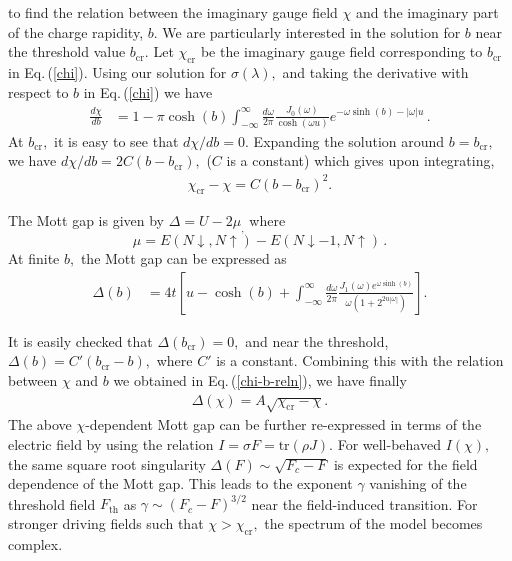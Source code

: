 \documentclass[aps,twocolumn,prl,10pt,amsmath,amssymb,nofootinbib,showpacs,superscriptaddress,floatfix]{revtex4-1}
\begin{document}
to find the relation between the imaginary gauge field $\chi$ and
the imaginary part of the charge rapidity, $b$. We are particularly
interested in the solution for $b$ near the threshold value $b_{\text{cr}}.$
Let $\chi_{\text{cr}}$ be the imaginary gauge field corresponding
to $b_{\text{cr}}$ in Eq.\,(\ref{chi}). Using our solution for $\sigma(\lambda),$
and taking the derivative with respect to $b$ in Eq.\,(\ref{chi}) we have 
\begin{align}
	\frac{d\chi}{db} & =1-\pi\cosh(b)\int_{-\infty}^{\infty}\frac{d\omega}{2\pi}\frac{J_{0}(\omega)}{\cosh(\omega u)}e^{-\omega\sinh(b)-|\omega|u}\,.\label{chi-soln}
\end{align}
At $b_{\text{cr}},$ it is easy to see that $d\chi/db=0.$ Expanding
the solution around $b=b_{\text{cr}},$ we have $d\chi/db=2C(b-b_{\text{cr}}),$
($C$ is a constant) which gives upon integrating, 
\begin{align}
	\chi_{\text{cr}}-\chi=C(b-b_{\text{cr}})^{2}.\label{chi-b-reln}
\end{align}

The Mott gap is given by\cite{lieb} $\Delta=U-2\mu_{,}$ where 
\begin{equation}
\mu=E(N\downarrow,N\uparrow)-E(N\downarrow-1,N\uparrow)\,.
\end{equation}
At finite $b,$ the Mott gap can be expressed as\,\cite{fukui} 
\begin{align}
	\Delta(b) & =4t\left[u-\cosh(b)+\int_{-\infty}^{\infty}\frac{d\omega}{2\pi}\frac{J_{1}(\omega)e^{\omega\sinh(b)}}{\omega(1+2^{2u|\omega|})}\right].\label{delta}
\end{align}


It is easily checked that $\Delta(b_{\text{cr}})=0,$ and near the
threshold, $\Delta(b)=C'(b_{\text{cr}}-b),$ where $C'$ is a constant.
Combining this with the relation between $\chi$ and $b$ we obtained
in Eq.\,(\ref{chi-b-reln}), we have finally 
\begin{align}
	\Delta(\chi)=A\sqrt{\chi_{\text{cr}}-\chi}.\label{chi-sqroot}
\end{align}
The above $\chi$-dependent Mott gap can be further re-expressed in
terms of the electric field by using the relation $I=\sigma F=\text{tr}(\rho J).$
For well-behaved $I(\chi),$ the same square root singularity $\Delta(F)\sim\sqrt{F_{c}-F}$
is expected for the field dependence of the Mott gap. This leads to
the exponent $\gamma$ vanishing of the threshold field $F_{\text{th}}$ as $\gamma\sim (F_{c}-F)^{3/2}$
near the field-induced transition. For stronger driving fields such
that $\chi>\chi_{\text{cr}},$ the spectrum of the model becomes complex.
\end{document}
